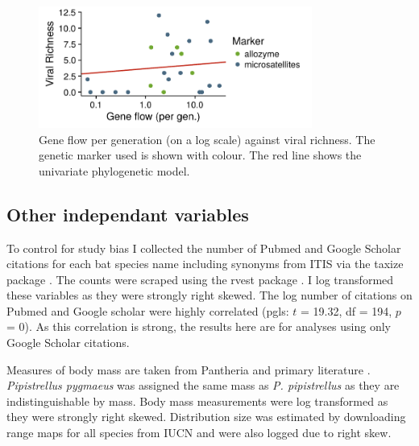 \begin{knitrout}\footnotesize
{}\color{fgcolor}\begin{figure}[t]

{\centering \includegraphics[width=0.8\textwidth]{figure/fstRawData-1} 

}

\caption[Gene flow per generation (on a log scale) against viral richness]{Gene flow per generation (on a log scale) against viral richness. The genetic marker used is shown with colour. The red line shows the univariate phylogenetic model.}\label{fig:fstRawData}
\end{figure}


\end{knitrout}

\subsection{Other independant variables}

To control for study bias I collected the number of Pubmed and Google Scholar citations for each bat species name including synonyms from ITIS \cite{itis} via the taxize package \cite{chamberlain2013taxize}.
The counts were scraped using the rvest package \cite{rvest}.
I log transformed these variables as they were strongly right skewed.
The log number of citations on Pubmed and Google scholar were highly correlated (pgls: $t$ = 19.32, df = 194, $p$ = 0).
As this correlation is strong, the results here are for analyses using only Google Scholar citations.

Measures of body mass are taken from Pantheria \cite{jones2009pantheria} and primary literature \cite{canals2005relative, arita1993rarity, lopez2014echolocation, orr2013does, lim2001bat, aldridge1987turning, ma2003dietary, owen2003home, henderson2008movements, heaney2012nyctalus, oleksy2015high, zhang2009recent}. 
\emph{Pipistrellus pygmaeus} was assigned the same mass as \emph{P. pipistrellus} as they are indistinguishable by mass.
Body mass measurements were log transformed as they were strongly right skewed.
Distribution size was estimated by downloading range maps for all species from IUCN \cite{iucn} and were also logged due to right skew.



